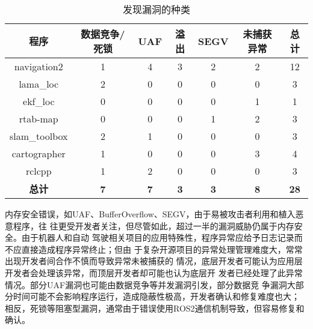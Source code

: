 \begin{table}[H]
	\small
	\caption{发现漏洞的种类}
  \label{tab:test_bug_types}
	\centering
	\begin{tabular}{ccccccc}
		\hline
		\textbf{程序} & \textbf{数据竞争/死锁} & \textbf{UAF} & \textbf{溢出} & \textbf{SEGV} & \textbf{未捕获异常} & \textbf{总计} \\
		\hline
		navigation2 & 1 & 4 & 3 & 2 & 2 & 12\\
		lama\_loc & 2 & 0 & 0 & 0 & 0 & 3 \\
		ekf\_loc & 0 & 0 & 0 & 0 & 1 & 1 \\
		rtab-map & 0 & 0 & 0 & 1 & 2 & 3 \\
		slam\_toolbox & 2 & 1 & 0 & 0 & 0 & 3 \\
		cartographer & 1 & 0 & 0 & 0 & 3 & 4 \\
    rclcpp & 1 & 2 & 0 & 0 & 0 & 3\\
		\textbf{总计} & \textbf{7} & \textbf{7} & \textbf{3} & \textbf{3} & \textbf{8} & \textbf{28} \\
		\hline
	\end{tabular}
\end{table}

内存安全错误，如UAF、BufferOverflow、SEGV，由于易被攻击者利用和植入恶意程序，往
往更受开发者关注，但尽管如此，超过一半的漏洞威胁仍属于内存安全。由于机器人和自动
驾驶相关项目的应用特殊性，程序异常应给予日志记录而不应直接造成程序异常终止；但由
于复杂开源项目的异常处理管理难度大，常常出现开发者间合作不慎而导致异常未被捕获的
情况，底层开发者可能认为应用层开发者会处理该异常，而顶层开发者却可能也认为底层开
发者已经处理了此异常情况。部分UAF漏洞也可能由数据竞争等并发漏洞引发，部分数据竞
争漏洞大部分时间可能不会影响程序运行，造成隐蔽性极高，开发者确认和修复难度也大；
相反，死锁等阻塞型漏洞，通常由于错误使用ROS2通信机制导致，但容易修复和确认。



